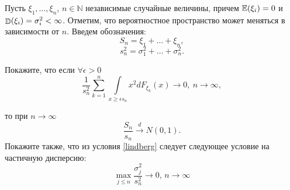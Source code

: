 \begin{problem}
Пусть   
$
\xi_{1}, \ldots , \xi_{n}
$, $n\in\mathbb{N}$ 
 независимые случайные величины, причем  $\mathrm{{\mathbb E}}(\xi_{i}) = 0$ и $\mathop{\mathbb{D}}\nolimits(\xi_{i}) = \sigma^2_{i} < \infty$. Отметим, что вероятностное пространство может меняться в зависимости от $n$. Введем обозначения: 
 \[
 S_n = \xi_{1} + \ldots + \xi_{n},
 \]
 \[
 s^2_n = \sigma^2_{1} + \ldots + \sigma^2_{n}.
 \]
  
Покажите, что если $\forall \epsilon > 0$ 
   \begin{equation} \label{lindberg}
  \frac{1}{s_n^2} \underset{k=1}{\overset{n}{\sum}} \underset{x \geq \epsilon s_n}{\int} x^2 dF_{\xi_{k}}(x) \rightarrow 0, \: n \rightarrow \infty,
  \end{equation} 
  
  \noindent то при $n\to\infty$
  $$
  \frac{S_n}{s_n} \overset{d}{\longrightarrow} N(0, 1).
  $$
  Покажите также, что из условия \eqref{lindberg} следует следующее условие на частичную дисперсию:
  $$
    \max_{j\leq n}\dfrac{\sigma_j^2}{s_n^2} \rightarrow 0, \, n\rightarrow \infty
  $$
\end{problem}

